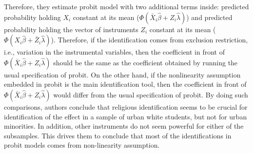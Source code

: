 \documentclass[]{article}
\begin{document}
Therefore, they estimate probit model with two additional terms inside: predicted probability holding $X_i$ constant at its mean ($\Phi(\bar{X}_i\hat{\beta} + Z_i\hat{\lambda})$) and predicted probability holding the vector of instruments $Z_i$ constant at its mean ($\Phi(X_i\hat{\beta} + \bar{Z}_i\hat{\lambda})$). Therefore, if the identification comes from exclusion restriction, i.e., variation in the instrumental variables, then the coefficient in front of $\Phi(\bar{X}_i\hat{\beta} + Z_i\hat{\lambda})$ should be the same as the coefficient obtained by running the usual specification of probit. On the other hand, if the nonlinearity assumption embedded in probit is the main identification tool, then the coefficient in front of $\Phi(\bar{X}_i\hat{\beta} + Z_i\hat{\lambda})$ would differ from the usual specification of probit. By doing such comparisons, authors conclude that religious identification seems to be crucial for identification of the effect in a sample of urban white students, but not for urban minorities. In addition, other instruments do not seem powerful for either of the subsamples. This drives them to conclude that most of the identifications in probit models comes from non-linearity assumption.
\end{document}
